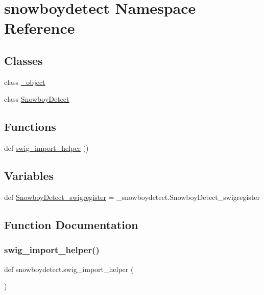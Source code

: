 \hypertarget{namespacesnowboydetect}{}\section{snowboydetect Namespace Reference}
\label{namespacesnowboydetect}
\subsection*{Classes}
\begin{DoxyCompactItemize}
\item 
class \hyperlink{classsnowboydetect_1_1__object}{\+\_\+object}
\item 
class \hyperlink{classsnowboydetect_1_1SnowboyDetect}{Snowboy\+Detect}
\end{DoxyCompactItemize}
\subsection*{Functions}
\begin{DoxyCompactItemize}
\item 
def \hyperlink{namespacesnowboydetect_af9f15d12aba083e153e2ad33268fc492}{swig\+\_\+import\+\_\+helper} ()
\end{DoxyCompactItemize}
\subsection*{Variables}
\begin{DoxyCompactItemize}
\item 
def \hyperlink{namespacesnowboydetect_ae461bf18026c86c408f7d1b2d0f428fd}{Snowboy\+Detect\+\_\+swigregister} = \+\_\+snowboydetect.\+Snowboy\+Detect\+\_\+swigregister
\end{DoxyCompactItemize}


\subsection{Function Documentation}
\mbox{\label{namespacesnowboydetect_af9f15d12aba083e153e2ad33268fc492}} 
\subsubsection{\texorpdfstring{swig\+\_\+import\+\_\+helper()}{swig\_import\_helper()}}
{\footnotesize\ttfamily def snowboydetect.\+swig\+\_\+import\+\_\+helper (\begin{DoxyParamCaption}{ }\end{DoxyParamCaption})}



